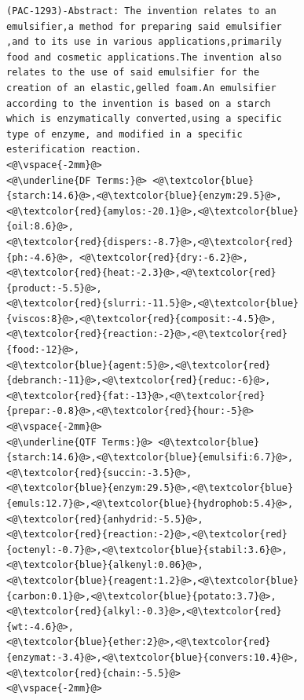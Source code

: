 \begin{figure}[t!]
\begin{framed}
\vspace*{-3.5ex}
  \centering
 \begin{lstlisting}[basicstyle=\scriptsize\ttfamily , linewidth=\columnwidth,breaklines=true] 
(PAC-1293)-Abstract: The invention relates to an 
emulsifier,a method for preparing said emulsifier
,and to its use in various applications,primarily 
food and cosmetic applications.The invention also 
relates to the use of said emulsifier for the 
creation of an elastic,gelled foam.An emulsifier 
according to the invention is based on a starch 
which is enzymatically converted,using a specific 
type of enzyme, and modified in a specific 
esterification reaction.
<@\vspace{-2mm}@>
<@\underline{DF Terms:}@> <@\textcolor{blue}{starch:14.6}@>,<@\textcolor{blue}{enzym:29.5}@>,<@\textcolor{red}{amylos:-20.1}@>,<@\textcolor{blue}{oil:8.6}@>,
<@\textcolor{red}{dispers:-8.7}@>,<@\textcolor{red}{ph:-4.6}@>, <@\textcolor{red}{dry:-6.2}@>,<@\textcolor{red}{heat:-2.3}@>,<@\textcolor{red}{product:-5.5}@>,
<@\textcolor{red}{slurri:-11.5}@>,<@\textcolor{blue}{viscos:8}@>,<@\textcolor{red}{composit:-4.5}@>,<@\textcolor{red}{reaction:-2}@>,<@\textcolor{red}{food:-12}@>,
<@\textcolor{blue}{agent:5}@>,<@\textcolor{red}{debranch:-11}@>,<@\textcolor{red}{reduc:-6}@>,<@\textcolor{red}{fat:-13}@>,<@\textcolor{red}{prepar:-0.8}@>,<@\textcolor{red}{hour:-5}@>
<@\vspace{-2mm}@>
<@\underline{QTF Terms:}@> <@\textcolor{blue}{starch:14.6}@>,<@\textcolor{blue}{emulsifi:6.7}@>,<@\textcolor{red}{succin:-3.5}@>,
<@\textcolor{blue}{enzym:29.5}@>,<@\textcolor{blue}{emuls:12.7}@>,<@\textcolor{blue}{hydrophob:5.4}@>,<@\textcolor{red}{anhydrid:-5.5}@>,
<@\textcolor{red}{reaction:-2}@>,<@\textcolor{red}{octenyl:-0.7}@>,<@\textcolor{blue}{stabil:3.6}@>,<@\textcolor{blue}{alkenyl:0.06}@>,
<@\textcolor{blue}{reagent:1.2}@>,<@\textcolor{blue}{carbon:0.1}@>,<@\textcolor{blue}{potato:3.7}@>,<@\textcolor{red}{alkyl:-0.3}@>,<@\textcolor{red}{wt:-4.6}@>,
<@\textcolor{blue}{ether:2}@>,<@\textcolor{red}{enzymat:-3.4}@>,<@\textcolor{blue}{convers:10.4}@>,<@\textcolor{red}{chain:-5.5}@>
<@\vspace{-2mm}@>

\end{lstlisting}
\end{framed}
\end{figure}
